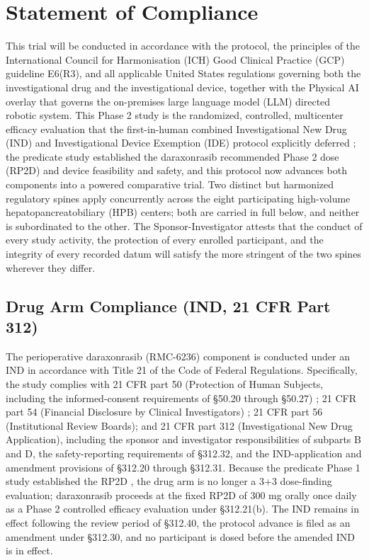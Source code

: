 \section{Statement of Compliance}

This trial will be conducted in accordance with the protocol, the principles of
the International Council for Harmonisation (ICH) Good Clinical Practice (GCP)
guideline E6(R3), and all applicable United States regulations governing both
the investigational drug and the investigational device, together with the
Physical AI overlay that governs the on-premises large language model (LLM)
directed robotic system. This Phase 2 study is the randomized, controlled,
multicenter efficacy evaluation that the first-in-human combined Investigational
New Drug (IND) and Investigational Device Exemption (IDE) protocol explicitly
deferred \cite{kawchak2026phase1}; the predicate study established the
daraxonrasib recommended Phase 2 dose (RP2D) and device feasibility and safety,
and this protocol now advances both components into a powered comparative trial.
Two distinct but harmonized regulatory spines apply concurrently across the eight
participating high-volume hepatopancreatobiliary (HPB) centers; both are carried
in full below, and neither is subordinated to the other. The Sponsor-Investigator
attests that the conduct of every study activity, the protection of every
enrolled participant, and the integrity of every recorded datum will satisfy the
more stringent of the two spines wherever they differ.

\subsection{Drug Arm Compliance (IND, 21 CFR Part 312)}

The perioperative daraxonrasib (RMC-6236) component is conducted under an IND in
accordance with Title 21 of the Code of Federal Regulations. Specifically, the
study complies with 21 CFR part 50 (Protection of Human Subjects, including the
informed-consent requirements of \S50.20 through \S50.27) \cite{ecfr2026part50};
21 CFR part 54 (Financial Disclosure by Clinical Investigators)
\cite{ecfr2026part54}; 21 CFR part 56 (Institutional Review Boards); and 21 CFR
part 312 (Investigational New Drug Application), including the sponsor and
investigator responsibilities of subparts B and D, the safety-reporting
requirements of \S312.32, and the IND-application and amendment provisions of
\S312.20 through \S312.31. Because the predicate Phase 1 study established the
RP2D \cite{kawchak2026phase1}, the drug arm is no longer a 3+3 dose-finding
evaluation; daraxonrasib proceeds at the fixed RP2D of 300 mg orally once daily
as a Phase 2 controlled efficacy evaluation under \S312.21(b). The IND remains in
effect following the review period of \S312.40, the protocol advance is filed as
an amendment under \S312.30, and no participant is dosed before the amended IND
is in effect.

